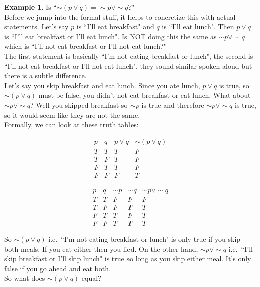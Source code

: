 \documentclass[10pt]{article}
\theoremstyle{definition}
\newtheorem{example}[equation]{Example}
\begin{document}
\begin{example}
Is ``$\sim(p \vee q)=\sim p \vee \sim q$?"\\

Before we jump into the formal stuff, it helps to concretize this with actual statements.  Let's say $p$ is ``I'll eat breakfast" and $q$ is ``I'll eat lunch".  Then $p \vee q$ is ``I'll eat breakfast or I'll eat lunch".  Is NOT doing this the same as $\sim p \vee \sim q$ which is ``I'll not eat breakfast or I'll not eat lunch?"\\

The first statement is basically ``I'm not eating breakfast or lunch", the second is ``I'll not eat breakfast or I'll not eat lunch", they sound similar spoken aloud but there is a subtle difference.\\

Let's say you skip breakfast and eat lunch.  Since you ate lunch, $p\vee q$ is true, so $\sim(p\vee q)$ must be false, you didn't not eat breakfast or eat lunch.  What about $\sim p \vee \sim q$?  Well you skipped breakfast so $\sim p$ is true and therefore $\sim p \vee \sim q$ is true, so it would seem like they are not the same.\\

Formally, we can look at these truth tables:

$$\begin{array}{c|c|c|c}
p&q&p\vee q& \sim (p\vee q)\\
\hline
T & T&T&F\\
T&F&T&F\\
F&T&T&F\\
F&F&F&T
\end{array}$$

$$\begin{array}{c|c|c|c|c}
p&q&\sim p& \sim q & \sim p \vee \sim q\\
\hline
T & T&F&F&F\\
T&F&F&T&T\\
F&T&T&F&T\\
F&F&T&T&T
\end{array}$$

So $\sim(p\vee q)$ i.e.\ ``I'm not eating breakfast or lunch" is only true if you skip both meals.  If you eat either then you lied.  On the other hand, $\sim p \vee \sim q$ i.e.\  ``I'll skip breakfast or I'll skip lunch" is true so long as you skip either meal.  It's only false if you go ahead and eat both.\\

So what does $\sim(p \vee q)$ equal?
\end{example}
\end{document}
